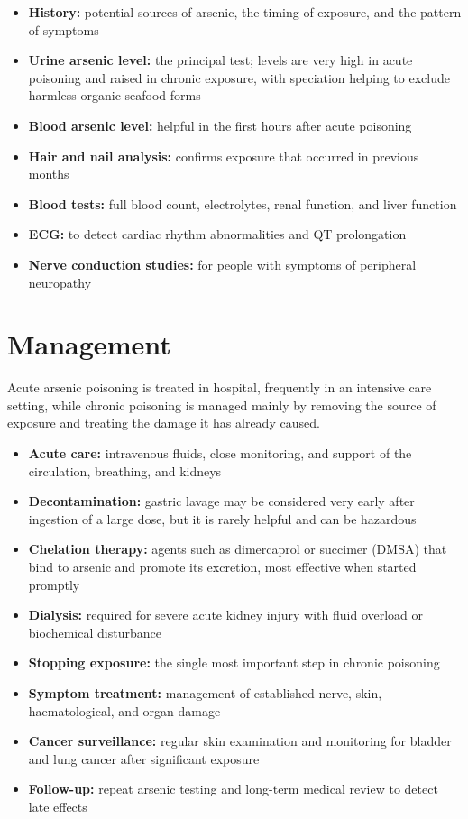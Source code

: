\begin{itemize}
    \item \textbf{History:} potential sources of arsenic, the timing of exposure, and the pattern of symptoms
    \item \textbf{Urine arsenic level:} the principal test; levels are very high in acute poisoning and raised in chronic exposure, with speciation helping to exclude harmless organic seafood forms
    \item \textbf{Blood arsenic level:} helpful in the first hours after acute poisoning
    \item \textbf{Hair and nail analysis:} confirms exposure that occurred in previous months
    \item \textbf{Blood tests:} full blood count, electrolytes, renal function, and liver function
    \item \textbf{ECG:} to detect cardiac rhythm abnormalities and QT prolongation
    \item \textbf{Nerve conduction studies:} for people with symptoms of peripheral neuropathy
\end{itemize}

\section*{Management}
Acute arsenic poisoning is treated in hospital, frequently in an intensive care setting, while chronic poisoning is managed mainly by removing the source of exposure and treating the damage it has already caused.

\begin{itemize}
    \item \textbf{Acute care:} intravenous fluids, close monitoring, and support of the circulation, breathing, and kidneys
    \item \textbf{Decontamination:} gastric lavage may be considered very early after ingestion of a large dose, but it is rarely helpful and can be hazardous
    \item \textbf{Chelation therapy:} agents such as dimercaprol or succimer (DMSA) that bind to arsenic and promote its excretion, most effective when started promptly
    \item \textbf{Dialysis:} required for severe acute kidney injury with fluid overload or biochemical disturbance
    \item \textbf{Stopping exposure:} the single most important step in chronic poisoning
    \item \textbf{Symptom treatment:} management of established nerve, skin, haematological, and organ damage
    \item \textbf{Cancer surveillance:} regular skin examination and monitoring for bladder and lung cancer after significant exposure
    \item \textbf{Follow-up:} repeat arsenic testing and long-term medical review to detect late effects
\end{itemize}

